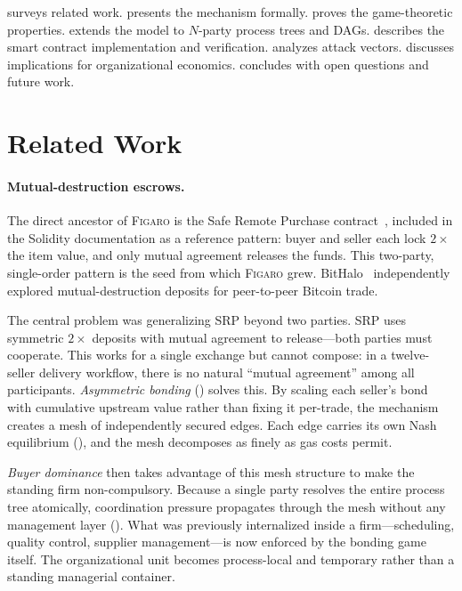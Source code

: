 \documentclass[11pt,a4paper]{article}
\theoremstyle{definition}
\theoremstyle{remark}
\newcommand{\figaro}{\textsc{Figaro}}
\begin{document}
 surveys related work.  presents
the mechanism formally.  proves the game-theoretic
properties.  extends the model to $N$-party
process trees and DAGs.  describes the smart
contract implementation and verification.  analyzes
attack vectors.  discusses implications for
organizational economics.  concludes with open
questions and future work.

\section{Related Work}
\label{sec:related}

\paragraph{Mutual-destruction escrows.}
The direct ancestor of \figaro{} is the Safe Remote Purchase
contract~\citep{buterin2016}, included in the Solidity documentation as
a reference pattern: buyer and seller each lock $2\times$ the item
value, and only mutual agreement releases the funds. This two-party,
single-order pattern is the seed from which \figaro{} grew.
BitHalo~\citep{bithalo2014} independently explored mutual-destruction
deposits for peer-to-peer Bitcoin trade.

The central problem was generalizing SRP beyond two parties. SRP uses
symmetric $2\times$ deposits with mutual agreement to release---both
parties must cooperate. This works for a single exchange but cannot
compose: in a twelve-seller delivery workflow, there is no natural
``mutual agreement'' among all participants. \emph{Asymmetric bonding}
() solves this. By scaling each seller's
bond with cumulative upstream value rather than fixing it per-trade,
the mechanism creates a mesh of independently secured edges. Each edge
carries its own Nash equilibrium (), and the
mesh decomposes as finely as gas costs permit.

\emph{Buyer dominance} then takes advantage of this mesh structure to
make the standing firm non-compulsory. Because a single party resolves
the entire process tree atomically, coordination pressure propagates
through the mesh without any management layer
(). What was previously internalized
inside a firm---scheduling, quality control, supplier
management---is now enforced by the bonding game itself. The
organizational unit becomes process-local and temporary rather than a
standing managerial container.
\end{document}
